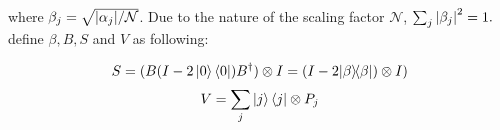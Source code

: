 \documentclass{article}
\def\kb#1#2{| #1 \rangle\!\langle #2 |}
\begin{document}
where $\beta_j = \sqrt{\abs{\alpha_j}/\mathcal{N}}$. Due to the nature of the scaling factor $\mathcal{N}$, $\sum_j \abs{\beta_j}^2 = 1.$
\\\textcite{poulin} define $\beta, B, S$ and  $V$ as following:


\[ S = (B (I - 2 \ket{0}\bra{0}) B^{\dagger}) \otimes I= (I-2\kb \beta \beta) \otimes I) \]
\[ V=\sum_{j}\ket{j}\bra{j} \otimes P_{j} \]



\printbibliography
\end{document}
